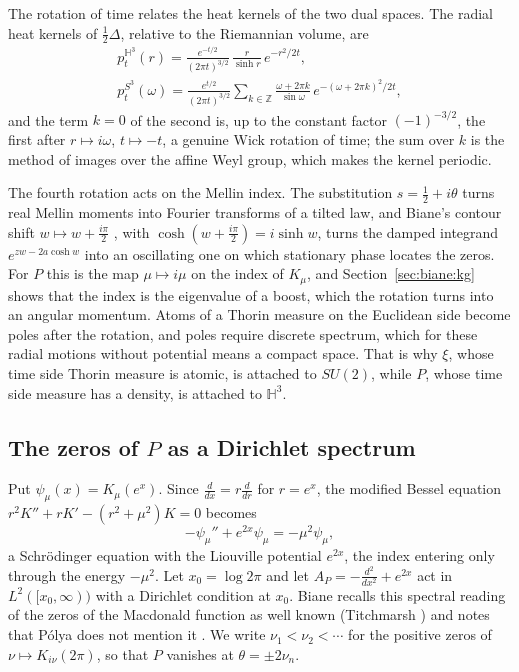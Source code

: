The rotation of time relates the heat kernels of the two dual spaces. The radial heat kernels of $\frac12\Delta$, relative to the Riemannian volume, are
\begin{gather*}
p^{\mathbb H^3}_t(r)=\frac{e^{-t/2}}{(2\pi t)^{3/2}}\,\frac r{\sinh r}\,e^{-r^2/2t},\\
p^{S^3}_t(\omega)=\frac{e^{t/2}}{(2\pi t)^{3/2}}\sum_{k\in\mathbb Z}\frac{\omega+2\pi k}{\sin\omega}\,e^{-(\omega+2\pi k)^2/2t},
\end{gather*}
and the term $k=0$ of the second is, up to the constant factor $(-1)^{-3/2}$, the first after $r\mapsto i\omega$, $t\mapsto-t$, a genuine Wick rotation of time; the sum over $k$ is the method of images over the affine Weyl group, which makes the kernel periodic.

The fourth rotation acts on the Mellin index. The substitution $s=\frac12+i\theta$ turns real Mellin moments into Fourier transforms of a tilted law, and Biane's contour shift $w\mapsto w+\frac{i\pi}2$ \cite[Section 3.5]{Biane09}, with $\cosh(w+\frac{i\pi}2)=i\sinh w$, turns the damped integrand $e^{zw-2a\cosh w}$ into an oscillating one on which stationary phase locates the zeros. For $P$ this is the map $\mu\mapsto i\mu$ on the index of $K_\mu$, and Section~\ref{sec:biane:kg} shows that the index is the eigenvalue of a boost, which the rotation turns into an angular momentum. Atoms of a Thorin measure on the Euclidean side become poles after the rotation, and poles require discrete spectrum, which for these radial motions without potential means a compact space. That is why $\xi$, whose time side Thorin measure is atomic, is attached to $SU(2)$, while $P$, whose time side measure has a density, is attached to $\mathbb H^3$.

\subsection{The zeros of \texorpdfstring{$P$}{P} as a Dirichlet spectrum}\label{sec:biane:zeros}

Put $\psi_\mu(x)=K_\mu(e^x)$. Since $\frac d{dx}=r\frac d{dr}$ for $r=e^x$, the modified Bessel equation $r^2K''+rK'-(r^2+\mu^2)K=0$ becomes
\[
-\psi_\mu''+e^{2x}\psi_\mu=-\mu^2\psi_\mu ,
\]
a Schr\"odinger equation with the Liouville potential $e^{2x}$, the index entering only through the energy $-\mu^2$. Let $x_0=\log2\pi$ and let $A_P=-\frac{d^2}{dx^2}+e^{2x}$ act in $L^2([x_0,\infty))$ with a Dirichlet condition at $x_0$. Biane recalls this spectral reading of the zeros of the Macdonald function as well known (Titchmarsh \cite{TitchmarshEigen46}) and notes that P\'olya does not mention it \cite[Section 3.3]{Biane09}. We write $\nu_1<\nu_2<\cdots$ for the positive zeros of $\nu\mapsto K_{i\nu}(2\pi)$, so that $P$ vanishes at $\theta=\pm2\nu_n$.


